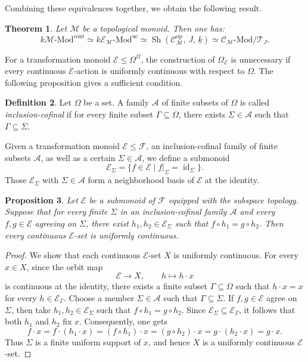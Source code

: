 \documentclass[10pt, reqno]{amsart}
\theoremstyle{plain}
\newtheorem{theorem}{Theorem}[section]
\newtheorem{proposition}[theorem]{Proposition}
\numberwithin{equation}{section}
\theoremstyle{definition}
\newtheorem{definition}[theorem]{Definition}
\newcommand{\Sh}{\operatorname{Sh}}
\newcommand{\Mod}{{\textrm{-}\mathrm{Mod}}}
\newcommand{\id}{\operatorname{id}}
\newcommand{\op}{\mathrm{op}}
\newcommand{\M}{\mathscr M}
\newcommand{\E}{\mathscr E}
\newcommand{\C}{\mathscr C}
\newcommand{\T}{\mathcal T}
\begin{document}
Combining these equivalences together, we obtain the following result.

\begin{theorem}
Let $\M$ be a topological monoid. Then one has:
\[
k\M \Mod^{\mathrm{cont}} \simeq k\E_\M \Mod^{\mathrm{uc}} \simeq \Sh(\C_\M^{\op}, \, J, \, \underline{k}) \simeq \C_\M \Mod/\T_J.
\]
\end{theorem}

For a transformation monoid $\E \leqslant \Omega^\Omega$, the construction of $\Omega_\E$ is unnecessary if every continuous $\E$-action is uniformly continuous with respect to $\Omega$. The following proposition gives a sufficient condition.

\begin{definition}
Let $\Omega$ be a set. A family $\mathcal A$ of finite subsets of $\Omega$ is called \emph{inclusion-cofinal} if for every finite subset $\Gamma \subseteq \Omega$, there exists $\Sigma \in \mathcal A$ such that $\Gamma \subseteq \Sigma$.
\end{definition}

Given a transformation monoid $\E \leqslant \mathscr{F}$, an inclusion-cofinal family of finite subsets $\mathcal{A}$, as well as a certain $\Sigma \in \mathcal{A}$, we define a submonoid
\[
\E_\Sigma = \{ f \in \E \mid f|_\Sigma = \id_\Sigma \}.
\]
Those $\E_\Sigma$ with $\Sigma \in \mathcal{A}$ form a neighborhood basis of $\E$ at the identity.

\begin{proposition}\label{prop:common-right-multiple}
Let $\E$ be a submonoid of $\mathscr{F}$ equipped with the subspace topology. Suppose that for every finite $\Sigma$ in an inclusion-cofinal family $\mathcal{A}$ and every $f, g \in \E$ agreeing on $\Sigma$, there exist $h_1, h_2 \in \E_\Sigma$ such that $f \circ h_1 = g \circ h_2$. Then every continuous $\E$-set is uniformly continuous.
\end{proposition}

\begin{proof}
We show that each continuous $\E$-set $X$ is uniformly continuous. For every $x \in X$, since the orbit map
\[
\E \longrightarrow X, \qquad h \longmapsto h \cdot x
\]
is continuous at the identity, there exists a finite subset $\Gamma \subseteq \Omega$ such that $h \cdot x = x$ for every $h \in \E_\Gamma$. Choose a member $\Sigma \in \mathcal{A}$ such that $\Gamma \subseteq \Sigma$. If $f, g \in \E$ agree on $\Sigma$, then take $h_1, h_2 \in \E_\Sigma$ such that $f \circ h_1 = g \circ h_2$. Since $\E_\Sigma \subseteq \E_\Gamma$, it follows that both $h_1$ and $h_2$ fix $x$. Consequently, one gets
\[
f \cdot x = f \cdot(h_1 \cdot x) = (f \circ h_1) \cdot x = (g\circ h_2) \cdot x = g \cdot (h_2 \cdot x) = g \cdot x.
\]
Thus $\Sigma$ is a finite uniform support of $x$, and hence $X$ is a uniformly continuous $\E$-set.
\end{proof}
\end{document}
